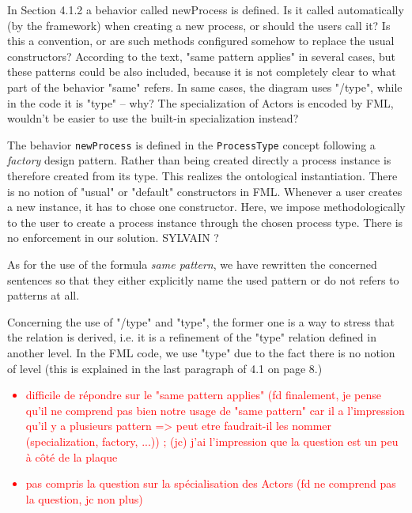\documentclass[10pt]{article}
\begin{document}
\begin{response}{In Section 4.1.2 a behavior called newProcess is defined. Is it called automatically (by the framework) when creating a new process, or should the users call it? Is this a convention, or are such methods configured somehow to replace the usual constructors? According to the text, "same pattern applies" in several cases, but these patterns could be also included, because it is not completely clear to what part of the behavior "same" refers. In same cases, the diagram uses "/type", while in the code it is "type" -- why? The specialization of Actors is encoded by FML, wouldn’t be easier to use the built-in specialization instead?}

{\color{teal}The behavior \texttt{newProcess} is defined in the \texttt{ProcessType} concept following a \emph{factory} design pattern. Rather than being created directly a process instance is therefore created from its type. This realizes the ontological instantiation. There is no notion of "usual" or "default" constructors in FML. Whenever a user creates a new instance, it has to chose one constructor. Here, we impose methodologically to the user to create a process instance through the chosen process type. There is no enforcement in our solution. SYLVAIN ?

As for the use of the formula \emph{same pattern}, we have rewritten the concerned sentences so that they either explicitly name the used pattern or do not refers to patterns at all.

Concerning the use of "/type" and "type", the former one is a way to stress that the relation is derived, i.e. it is a refinement of the "type" relation defined in another level. In the FML code, we use "type" due to the fact there is no notion of level (this is explained in the last paragraph of 4.1 on page 8.)}
\textcolor{red}{
\begin{itemize}
\item difficile de répondre sur le "same pattern applies"  (fd finalement, je pense qu'il ne comprend pas bien notre usage de "same pattern" car il a l'impression qu'il y a plusieurs pattern => peut etre faudrait-il les nommer (specialization, factory, ...)) ; (jc) j'ai l'impression que la question est un peu à côté de la plaque
\item pas compris la question sur la spécialisation des Actors (fd ne comprend pas la question, jc non plus)
\end{itemize}
}

\end{response}
\end{document}
